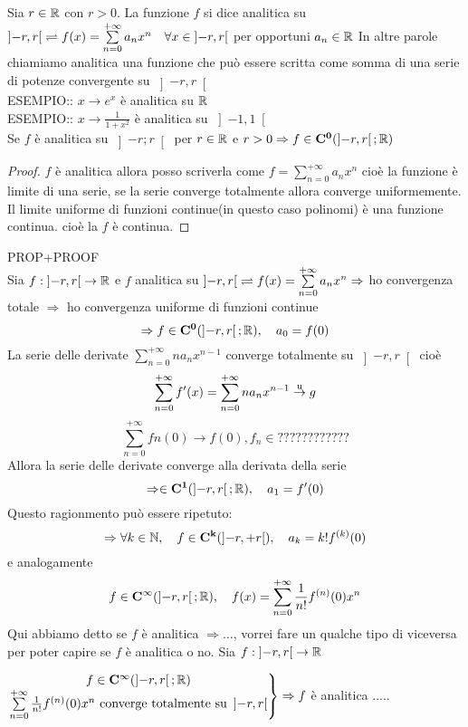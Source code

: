 Sia $r\in \mathbb{R}$ con $r>0$. La funzione $f$ si dice analitica su $\left]-r,r\right[ \rightleftharpoons f(x)=\sum\limits_{n=0}^{+\infty}a_nx^n \quad \forall x\in\left]-r,r\right[$ per opportuni $a_n\in \mathbb{R}$
\observation
In altre parole chiamiamo analitica una funzione che può essere scritta come somma di una serie di potenze convergente su $\left]-r,r\right[$ \\
ESEMPIO:: $x\to e^x$ è analitica su $ \mathbb{R}$\\
ESEMPIO:: $x\to\frac{1}{1+x^2}$ è analitica su $\left]-1,1\right[$\\
\proposition
Se $f$ è analitica su $\left]-r;r\right[$ per $r\in \mathbb{R}$ e $r>0\Rightarrow f\in \mathbf{C^{0}}(\left]-r,r\right[; \mathbb{R})$
\begin{proof}
	$f$ è analitica  allora posso scriverla come $f=\sum\limits_{n=0}^{+\infty}a_nx^n$ cioè la funzione è limite di una serie, se la serie converge totalmente allora converge uniformemente. Il limite uniforme di funzioni continue(in questo caso polinomi) è una funzione continua. cioè la $f$ è continua.
\end{proof}
\proposition PROP+PROOF\\
Sia $f:\left]-r,r\right[\to \mathbb{R}$ e $f$ analitica su $\left]-r,r\right[ \rightleftharpoons f(x)=\sum\limits_{n=0}^{+\infty}a_nx^n \Rightarrow$ ho convergenza totale $\Rightarrow$ ho convergenza uniforme di funzioni continue
$$\Rightarrow f\in \mathbf{C^{0}}(\left]-r,r\right[; \mathbb{R}),\quad a_0=f(0)$$
La serie delle derivate $\sum\limits_{n=0}^{+\infty}na_nx^{n-1}$ converge totalmente su $\left]-r,r\right[$ cioè
$$\sum\limits_{n=0}^{+\infty}f'(x)=\sum\limits_{n=0}^{+\infty}na_nx^{n-1} \overset{\text{u}}{\to} g$$
$$\sum\limits_{n=0}^{+\infty}fn(0)\to f(0), f_n\in ????????????$$
Allora la serie delle derivate converge alla derivata della serie
$$\Rightarrow \in \mathbf{C^{1}}(\left]-r,r\right[; \mathbb{R}),\quad a_1=f'(0)$$
Questo ragionmento può essere ripetuto:
$$\Rightarrow \forall k\in\mathbb{N},\quad f\in \mathbf{C^{k}}(\left]-r,+r\right[),\quad a_k=k!f^{(k)}(0)$$
e analogamente
$$f\in \mathbf{C^{\infty}}(\left]-r,r\right[; \mathbb{R}),\quad f(x)=\sum\limits_{n=0}^{+\infty}\frac{1}{n!}f^{(n)}(0)x^n$$
\observation Qui abbiamo detto se $f$ è analitica $\Rightarrow \ldots$, vorrei fare un qualche tipo di viceversa per poter capire se $f$ è analitica o no.
\proposition
Sia $f:\left]-r,r\right[\to \mathbb{R}$
\begin{center}
	$\left.\begin{matrix}
	f\in \mathbf{C^{\infty}}(\left]-r,r\right[; \mathbb{R})\\
	\sum\limits_{n=0}^{+\infty}\frac{1}{n!}f^{(n)}(0)x^n\text{ converge totalmente su } \left]-r,r\right[\\
	\end{matrix}\right\}\Rightarrow f$ è analitica  .....
\end{center}
